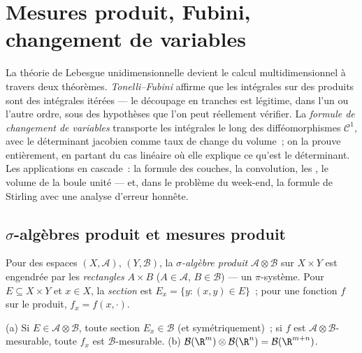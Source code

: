 \chapter{Mesures produit, Fubini, changement de variables}
\label{ch:b3:product}

La théorie de Lebesgue unidimensionnelle devient le calcul
multidimensionnel à travers deux théorèmes. \emph{Tonelli--Fubini}
affirme que les intégrales sur des produits sont des intégrales
itérées --- le découpage en tranches est légitime, dans l'un ou
l'autre ordre, sous des hypothèses que l'on peut réellement
vérifier. La \emph{formule de changement de variables} transporte
les intégrales le long des difféomorphismes $\mathcal C^1$, avec le
déterminant jacobien comme taux de change du volume~; on la prouve
entièrement, en partant du cas linéaire où elle explique ce qu'est
le déterminant. Les applications en cascade~: la formule des
couches, la convolution, les , le volume de la
boule unité --- et, dans le problème du week-end, la formule de
Stirling avec une analyse d'erreur honnête.

\section{$\sigma$-algèbres produit et mesures produit}

\begin{definition}\label{def:b3:product:sigma}
Pour des espaces  $(X, \mathcal A)$, $(Y, \mathcal B)$,
la \emph{$\sigma$-algèbre produit} $\mathcal A \otimes \mathcal B$
sur $X \times Y$ est engendrée par les \emph{rectangles} $A
\times B$ ($A \in \mathcal A$, $B \in \mathcal B$) --- un
$\pi$-système. Pour $E \subseteq X\times Y$ et $x \in X$, la
\emph{section} est $E_x = \{y : (x,y) \in E\}$~; pour une fonction
$f$ sur le produit, $f_x = f(x, \cdot)$.
\end{definition}

\begin{proposition}\label{prop:b3:product:sections}
(a) Si $E \in \mathcal A\otimes\mathcal B$, toute section $E_x
\in \mathcal B$ (et symétriquement)~; si $f$ est $\mathcal
A\otimes\mathcal B$-mesurable, toute $f_x$ est $\mathcal
B$-mesurable.
(b) $\mathcal B(\R^m)\otimes\mathcal B(\R^n) = \mathcal
B(\R^{m+n})$.
\end{proposition}

